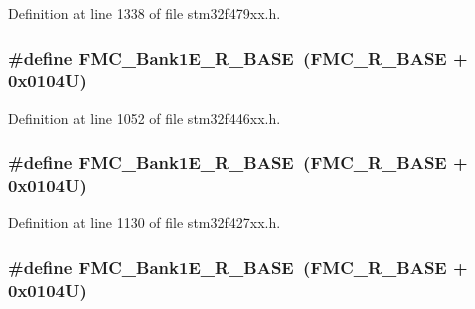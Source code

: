Definition at line 1338 of file stm32f479xx.\+h.

\subsubsection[{\texorpdfstring{F\+M\+C\+\_\+\+Bank1\+E\+\_\+\+R\+\_\+\+B\+A\+SE}{FMC_Bank1E_R_BASE}}]{\setlength{\rightskip}{0pt plus 5cm}\#define F\+M\+C\+\_\+\+Bank1\+E\+\_\+\+R\+\_\+\+B\+A\+SE~({\bf F\+M\+C\+\_\+\+R\+\_\+\+B\+A\+SE} + 0x0104\+U)}\hypertarget{group___peripheral__memory__map_gad82d3a6bac014fa645fb67a63fae4bc0}{}\label{group___peripheral__memory__map_gad82d3a6bac014fa645fb67a63fae4bc0}


Definition at line 1052 of file stm32f446xx.\+h.

\subsubsection[{\texorpdfstring{F\+M\+C\+\_\+\+Bank1\+E\+\_\+\+R\+\_\+\+B\+A\+SE}{FMC_Bank1E_R_BASE}}]{\setlength{\rightskip}{0pt plus 5cm}\#define F\+M\+C\+\_\+\+Bank1\+E\+\_\+\+R\+\_\+\+B\+A\+SE~({\bf F\+M\+C\+\_\+\+R\+\_\+\+B\+A\+SE} + 0x0104\+U)}\hypertarget{group___peripheral__memory__map_gad82d3a6bac014fa645fb67a63fae4bc0}{}\label{group___peripheral__memory__map_gad82d3a6bac014fa645fb67a63fae4bc0}


Definition at line 1130 of file stm32f427xx.\+h.

\subsubsection[{\texorpdfstring{F\+M\+C\+\_\+\+Bank1\+E\+\_\+\+R\+\_\+\+B\+A\+SE}{FMC_Bank1E_R_BASE}}]{\setlength{\rightskip}{0pt plus 5cm}\#define F\+M\+C\+\_\+\+Bank1\+E\+\_\+\+R\+\_\+\+B\+A\+SE~({\bf F\+M\+C\+\_\+\+R\+\_\+\+B\+A\+SE} + 0x0104\+U)}\hypertarget{group___peripheral__memory__map_gad82d3a6bac014fa645fb67a63fae4bc0}{}\label{group___peripheral__memory__map_gad82d3a6bac014fa645fb67a63fae4bc0}


